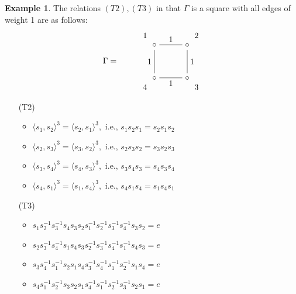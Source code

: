 \documentclass[11pt]{amsart}
\theoremstyle{definition}
\newtheorem{ex}[thm]{Example}
\begin{document}
\begin{ex}
The relations $(T2),(T3)$ in that $\Gamma$ is a square with all edges of weight 1 are as follows:
\[\Gamma =\begin{tikzpicture}[baseline=-0.5ex]
\matrix[matrix of math nodes,column sep={40pt,between origins},row
sep={40pt,between origins},nodes={asymmetrical rectangle}] at (6,0)
{
& |[name = ul]|\circ& |[name = ur]|\circ\\
%
&|[name=dl]| \circ &|[name=dr]| \circ \\
};
\draw
(ul) -- node[above] {1} (ur)
;
\draw
(dl) -- node[left]{1}(ul)
;
\draw
(dr) -- node[below]{1}(dl)
;
\draw
(ur) -- node[right]{1} (dr)
;
\node [yshift = .4 cm,xshift = -.4 cm] at (ul){1};
\node [yshift = .4 cm,xshift = .4 cm] at (ur){2};
\node [yshift = -.4 cm,xshift = .4 cm] at (dr){3};
\node [yshift = -.4 cm,xshift = -.4 cm] at (dl){4};
\end{tikzpicture}\]
   \begin{enumerate}
\item[(T2)]
\begin{itemize}
\item $\langle s_1,s_2 \rangle^3 = \langle s_2,s_1 \rangle^3,$ i.e., $s_1s_2s_1 = s_2s_1s_2$
\item $\langle s_2,s_3 \rangle^3 = \langle s_3,s_2 \rangle^3,$ i.e., $s_2s_3s_2 = s_3s_2s_3$
\item $\langle s_3,s_4 \rangle^3 = \langle s_4,s_3 \rangle^3,$ i.e., $s_3s_4s_3 = s_4s_3s_4$
\item $\langle s_4,s_1 \rangle^3 = \langle s_1,s_4 \rangle^3,$ i.e., $s_4s_1s_4 = s_1s_4s_1$
\end{itemize}
\item[(T3)]
\begin{itemize}
\item $s_{1}s_{2}^{-1}s_{3}^{-1}s_4s_{3}s_2s_1^{-1}s_2^{-1}s_3^{-1}s_4^{-1}s_3s_2 = e$
\item $s_{2}s_{3}^{-1}s_{4}^{-1}s_1s_{4}s_3s_2^{-1}s_3^{-1}s_4^{-1}s_1^{-1}s_4s_3 = e$
\item $s_{3}s_{4}^{-1}s_{1}^{-1}s_2s_{1}s_4s_3^{-1}s_4^{-1}s_1^{-1}s_2^{-1}s_1s_4 = e$
\item $s_{4}s_{1}^{-1}s_{2}^{-1}s_3s_{2}s_1s_4^{-1}s_1^{-1}s_2^{-1}s_3^{-1}s_2s_1 = e$
\end{itemize}
\end{enumerate}
\end{ex}
\end{document}
